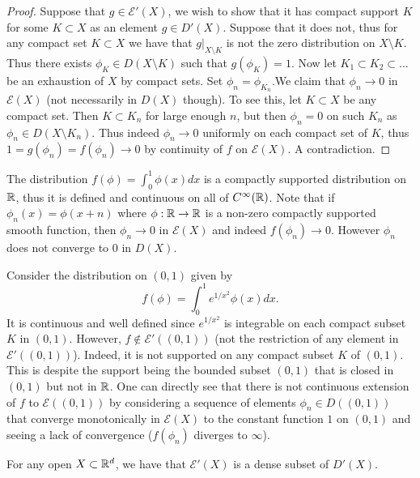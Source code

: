 \documentclass[twoside, a4paper, 10pt]{amsart}
\begin{document}
\begin{proof} Suppose that $g \in \mathcal{E}'(X)$, we wish to show that it has compact support $K$ for some $K \subset X$ as an element $g \in D'(X)$. Suppose that it does not, thus for any compact set $K \subset X$ we have that $g|_{X \setminus K}$ is not the zero distribution on $X \setminus K$. Thus there exists $\phi_K \in D(X \setminus K)$ such that $g(\phi_K) = 1$. Now let $K_1 \subset K_2 \subset \ldots $ be an exhaustion of $X$ by compact sets. Set $\phi_{n} = \phi_{K_n}$.We claim that $\phi_n \to 0$ in $\mathcal{E}(X)$ (not necessarily in $D(X)$ though). To see this, let $K \subset X$ be any compact set. Then $K \subset K_n$ for large enough $n$, but then $\phi_n = 0$ on such $K_n$ as $\phi_n \in D(X \setminus K_n)$. Thus indeed $\phi_n \to 0$ uniformly on each compact set of $K$, thus $1 = g(\phi_n) = f(\phi_n) \to 0$ by continuity of $f$ on $\mathcal{E}(X)$. A contradiction. \end{proof}

\begin{eg} The distribution $f(\phi) = \int_{0}^1 \phi(x) dx $ is a compactly supported distribution on $\mathbb{R}$, thus it is defined and continuous on all of $C^{\infty}(\mathbb{R})$. Note that if $\phi_n(x) = \phi(x+n)$ where $\phi:\mathbb{R} \to \mathbb{R}$ is a non-zero compactly supported smooth function, then $\phi_n \to 0$ in $\mathcal{E}(X)$ and indeed $f(\phi_n) \to 0$. However $\phi_n$ does not converge to $0$ in $D(X)$.

\end{eg}

\begin{eg} Consider the distribution on $(0,1)$ given by $$f(\phi) = \int_{0}^1 e^{1/x^2} \phi(x) dx.$$ It is continuous and well defined since $e^{1/x^2}$ is integrable on each compact subset $K$ in $(0,1)$. However, $f \notin \mathcal{E}'((0,1))$ (not the restriction of any element in $\mathcal{E}'((0,1))$). Indeed, it is not supported on any compact subset $K$ of $(0,1)$. This is despite the support being the bounded subset $(0,1)$ that is closed in $(0,1)$ but not in $\mathbb{R}$. One can directly see that there is not continuous extension of $f$ to $\mathcal{E}((0,1))$ by considering a sequence of elements $\phi_n \in D((0,1))$ that converge monotonically in $\mathcal{E}(X)$ to the constant function $1$ on $(0,1)$ and seeing a lack of convergence ($f(\phi_n)$ diverges to $\infty$).

\end{eg}

\begin{thm} For any open $X \subset \mathbb{R}^d$, we have that $\mathcal{E}'(X)$ is a dense subset of $D'(X)$.

\end{thm}
\end{document}
